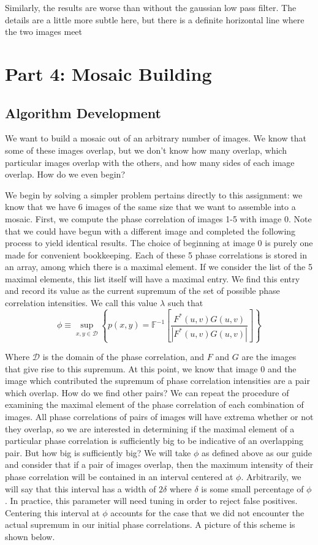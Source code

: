 \documentclass[]{article}
\begin{document}
Similarly, the results are worse than without the gaussian low pass filter. The details are a little more subtle here, but there is a definite horizontal line where the two images meet
\newpage

\section{Part 4: Mosaic Building}
\subsection{Algorithm Development}
We want to build a mosaic out of an arbitrary number of images. We know that some of these images overlap, but we don't know how many overlap, which particular images overlap with the others, and how many sides of each image overlap. How do we even begin?

We begin by solving a simpler problem pertains directly to this assignment: we know that we have 6 images of the same size that we want to assemble into a mosaic. First, we compute the phase correlation of images 1-5 with image 0. Note that we could have begun with a different image and completed the following process to yield identical results. The choice of beginning at image 0 is purely one made for convenient bookkeeping. Each of these 5 phase correlations is stored in an array, among which there is a maximal element. If we consider the list of the 5 maximal elements, this list itself will have a maximal entry. We find this entry and record its value as the current supremum of the set of possible phase correlation intensities. We call this value $\lambda$ such that 
\[\phi \equiv \sup_{x,y \in \mathcal{D}} \left\{p(x, y)=\mathbb{F}^{-1}\left[\frac{F^{*}(u, v) G(u, v)}{\left|F^{*}(u, v) G(u, v)\right|}\right]\right\}\] 

Where $\mathcal{D}$ is the domain of the phase correlation, and $F$ and $G$ are the images that give rise to this supremum. At this point, we know that image 0 and the image which contributed the supremum of phase correlation intensities are a pair which overlap. How do we find other pairs? We can repeat the procedure of examining the maximal element of the phase correlation of each combination of images. All phase correlations of pairs of images will have extrema whether or not they overlap, so we are interested in determining if the maximal element of a particular phase correlation is sufficiently big to be indicative of an overlapping pair. But how big is sufficiently big? We will take $\phi$ as defined above as our guide and consider that if a pair of images overlap, then the maximum intensity of their phase correlation will be contained in an interval centered at $\phi$. Arbitrarily, we will say that this interval has a width of $2\delta$ where $\delta$ is some small percentage of $\phi$. In practice, this parameter will need tuning in order to reject false positives. Centering this interval at $\phi$ accounts for the case that we did not encounter the actual supremum in our initial phase correlations. A picture of this scheme is shown below.
\end{document}
